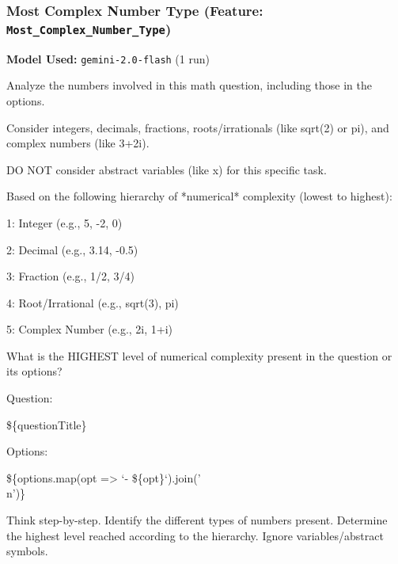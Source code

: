 \documentclass[
    a4paper, %
    10pt, %
    twoside, %
]{LTJournalArticle}
\begin{document}
\subsubsection{Most Complex Number Type (Feature: \texttt{Most\_Complex\_Number\_Type})}
\label{app:prompt_complex_number_type}
\textbf{Model Used:} \texttt{gemini-2.0-flash} (1 run)
\begin{promptbox}
Analyze the numbers involved in this math question, including those in the options.

\vspace{1em}

Consider integers, decimals, fractions, roots/irrationals (like sqrt(2) or pi), and complex numbers (like 3+2i).

\vspace{1em}

DO NOT consider abstract variables (like x) for this specific task.

\vspace{1em}

Based on the following hierarchy of *numerical* complexity (lowest to highest):

1: Integer (e.g., 5, -2, 0)

2: Decimal (e.g., 3.14, -0.5)

3: Fraction (e.g., 1/2, 3/4)

4: Root/Irrational (e.g., sqrt(3), pi)

5: Complex Number (e.g., 2i, 1+i)

\vspace{1em}

What is the HIGHEST level of numerical complexity present in the question or its options?

\vspace{1em}

Question:

\$\{questionTitle\}

\vspace{1em}

Options:

\$\{options.map(opt => `- \$\{opt\}`).join('\\n')\}

\vspace{1em}

Think step-by-step. Identify the different types of numbers present. Determine the highest level reached according to the hierarchy. Ignore variables/abstract symbols.
\end{promptbox}
\end{document}
